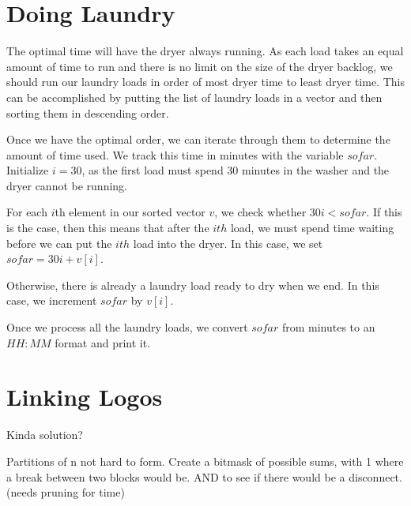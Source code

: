 \documentclass{article}
\begin{document}
\section{Doing Laundry}
The optimal time will have the dryer always running. As each load takes an equal amount of time to run and there is no limit on the size of the dryer backlog, we should run our laundry loads in order of most dryer time to least dryer time. This can be accomplished by putting the list of laundry loads in a vector and then sorting them in descending order. 
\par 
Once we have the optimal order, we can iterate through them to determine the amount of time used. We track this time in minutes with the variable $sofar$. Initialize $i=30$, as the first load must spend 30 minutes in the washer and the dryer cannot be running.
\par 
For each $i$th element in our sorted vector $v$, we check whether $30i<sofar$. If this is the case, then this means that after the $ith$ load, we must spend time waiting before we can put the $ith$ load into the dryer. In this case, we set $sofar=30i+v[i]$.
\par 
Otherwise, there is already a laundry load ready to dry when we end. In this case, we increment $sofar$ by $v[i]$.
\par 
Once we process all the laundry loads, we convert $sofar$ from minutes to an $HH:MM$ format and print it.

\section{Linking Logos}
Kinda solution?

Partitions of n not hard to form. Create a bitmask of possible sums, with 1 where a break between two blocks would be. AND to see if there would be a disconnect. (needs pruning for time)
\end{document}
